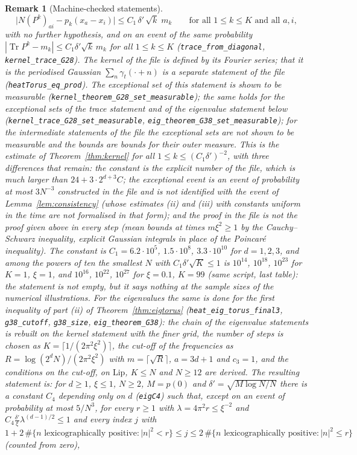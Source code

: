 \documentclass[11pt,a4paper]{article}
\theoremstyle{stmt}
\theoremstyle{defn}
\theoremstyle{rmk}
\newtheorem{remark}[theorem]{Remark}
\numberwithin{equation}{section}
\DeclareMathOperator{\Tr}{Tr}
\begin{document}
{\begin{remark}[Machine-checked statements]
\[
\big|N(P^k)_{ai}-p_k(x_a-x_i)\big|\le C_1\,\delta'\,\sqrt k\;m_k\qquad\text{for all }1\le k\le K\text{ and all }a,i,
\]
with no further hypothesis, and on an event of the same probability $|\Tr P^k-m_k|\le C_1\delta'\sqrt k\,m_k$ for all $1\le k\le K$ (\texttt{trace\_from\_diagonal}, \texttt{kernel\_trace\_G28}). The kernel of the file is defined by its Fourier series; that it is the periodised Gaussian $\sum_n\gamma_t(\cdot+n)$ is a separate statement of the file (\texttt{heatTorus\_eq\_prod}). The exceptional set of this statement is shown to be measurable (\texttt{kernel\_theorem\_G28\_set\_measurable}); the same holds for the exceptional sets of the trace statement and of the eigenvalue statement below (\texttt{kernel\_trace\_G28\_set\_measurable}, \texttt{eig\_theorem\_G38\_set\_measurable}); for the intermediate statements of the file the exceptional sets are not shown to be measurable and the bounds are bounds for their outer measure. This is the estimate of Theorem~\ref{thm:kernel} for all $1\le k\le(C_1\delta')^{-2}$, with three differences that remain: the constant is the explicit number of the file, which is much larger than $24+3\cdot2^{d+3}C$; the exceptional event is an event of probability at most $3N^{-3}$ constructed in the file and is not identified with the event of Lemma~\ref{lem:consistency} (whose estimates (ii) and (iii) with constants uniform in the time are not formalised in that form); and the proof in the file is not the proof given above in every step (mean bounds at times $m\xi^2\ge1$ by the Cauchy--Schwarz inequality, explicit Gaussian integrals in place of the Poincar\'e inequality). The constant is $C_1=6.2\cdot10^{5}$, $1.5\cdot10^{8}$, $3.3\cdot10^{10}$ for $d=1,2,3$, and among the powers of ten the smallest $N$ with $C_1\delta'\sqrt K\le1$ is $10^{14}$, $10^{18}$, $10^{23}$ for $K=1$, $\xi=1$, and $10^{16}$, $10^{22}$, $10^{27}$ for $\xi=0.1$, $K=99$ (same script, last table): the statement is not empty, but it says nothing at the sample sizes of the numerical illustrations. For the eigenvalues the same is done for the first inequality of part (ii) of Theorem~\ref{thm:eigtorus} (\texttt{heat\_eig\_torus\_final3}, \texttt{g38\_cutoff}, \texttt{g38\_size}, \texttt{eig\_theorem\_G38}): the chain of the eigenvalue statements is rebuilt on the kernel statement with the finer grid, the number of steps is chosen as $K=\lceil1/(2\pi^2\xi^2)\rceil$, the cut-off of the frequencies as $R=\log(2^dN)/(2\pi^2\xi^2)$ with $m=\lceil\sqrt R\rceil$, $a=3d+1$ and $c_3=1$, and the conditions on the cut-off, on $\mathrm{Lip}$, $K\le N$ and $N\ge12$ are derived. The resulting statement is: for $d\ge1$, $\xi\le1$, $N\ge2$, $M=p(0)$ and $\delta'=\sqrt{M\log N/N}$ there is a constant $C_4$ depending only on $d$ (\texttt{eigC4}) such that, except on an event of probability at most $5/N^3$, for every $r\ge1$ with $\lambda=4\pi^2r\le\xi^{-2}$ and $C_4\frac{\delta'}\xi\lambda^{(d-1)/2}\le1$ and every index $j$ with $1+2\,\#\{n\text{ lexicographically positive}:|n|^2<r\}\le j\le2\,\#\{n\text{ lexicographically positive}:|n|^2\le r\}$ (counted from zero),

\end{remark}}
\end{document}
